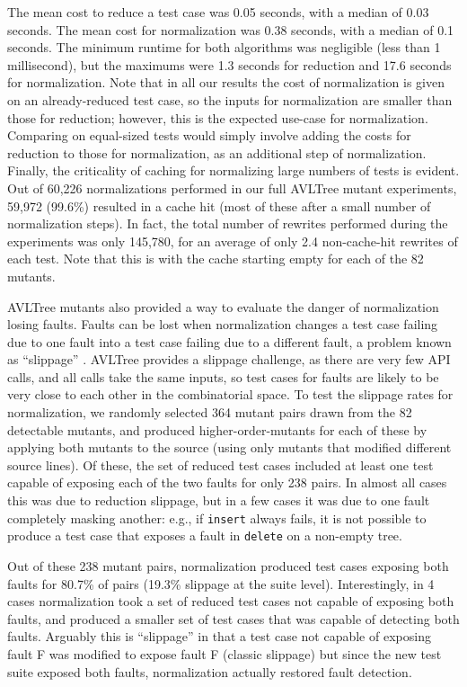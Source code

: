 The mean cost to reduce a
test case was 0.05 seconds, with a median of 0.03 seconds.  The mean
cost for normalization was 0.38 seconds, with a median of 0.1 seconds.
The minimum runtime for both algorithms was negligible (less than 1
millisecond), but the maximums were 1.3 seconds for reduction and 17.6
seconds for normalization.  Note that in all our results the cost of
normalization is given on an already-reduced test case, so the inputs
for normalization are smaller than those for reduction; however, this
is the expected use-case for normalization.  Comparing on equal-sized
tests would simply involve adding the costs for reduction to those for
normalization, as an additional step of normalization.  Finally, the
criticality of caching for normalizing large numbers of tests is
evident.  Out of 60,226 normalizations performed in our full AVLTree mutant
experiments, 59,972 (99.6\%) resulted in a cache hit (most of these
after a small number of normalization steps).  In fact, the total
number of rewrites performed during the experiments was only 145,780,
for an average of only 2.4 non-cache-hit rewrites of each test.  Note
that this is with the cache starting empty for each of the 82 mutants.

AVLTree mutants also provided a way to evaluate the danger of
normalization losing faults.  Faults can be lost when normalization
changes a test case failing due to one fault into a test case failing
due to a different fault, a problem known as ``slippage''
\cite{PLDI13}.  AVLTree provides a slippage challenge, as there are
very few API calls, and all calls take the same inputs, so test cases
for faults are likely to be very close to each other in the
combinatorial space.  To test the slippage rates for normalization, we
randomly selected 364 mutant pairs drawn from the 82 detectable
mutants, and produced higher-order-mutants for each of these by
applying both mutants to the source (using only mutants that modified
different source lines).  Of these, the set of reduced test cases
included at least one test capable of exposing each of the two faults
for only 238 pairs.  In almost all cases this was due to reduction
slippage, but in a few cases it was due to one fault completely
masking another: e.g., if {\tt insert} always fails, it is not
possible to produce a test case that exposes a fault in {\tt delete}
on a non-empty tree.

Out of these 238 mutant pairs, normalization produced test cases
exposing both faults for 80.7\% of pairs (19.3\% slippage at the
suite level).  Interestingly, in 4 cases
normalization took a set of reduced test cases not capable of exposing
both faults, and produced a smaller set of test cases that was capable
of detecting both faults.  Arguably this is ``slippage'' in that a test case not
capable of exposing fault F was modified to expose fault F (classic
slippage) but since the new test suite exposed both faults,
normalization actually restored fault detection.

